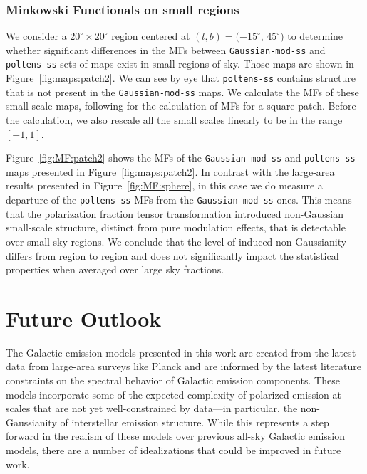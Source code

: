 \documentclass[twocolumn]{aastex631}
\begin{document}
\subsubsection{Minkowski Functionals on small regions}
We consider a $20^{\circ}\times20^{\circ}$ region centered at $(l, b) = (-15^{\circ}$, $45^{\circ})$ to determine whether significant differences in the MFs between \texttt{Gaussian-mod-ss} and \texttt{poltens-ss} sets of maps exist in small regions of sky. Those maps are shown in Figure~\ref{fig:maps:patch2}. We can see by eye that \texttt{poltens-ss} contains structure that is not present in the \texttt{Gaussian-mod-ss} maps. We calculate the MFs of these small-scale maps, following \cite{Mantz:2008} for the calculation of MFs for a square patch. Before the calculation, we also rescale all the small scales linearly to be in the range $[-1, 1]$.

Figure~\ref{fig:MF:patch2} shows the MFs of the \texttt{Gaussian-mod-ss} and \texttt{poltens-ss} maps presented in Figure~\ref{fig:maps:patch2}. In contrast with the large-area results presented in Figure~\ref{fig:MF:sphere}, in this case we do measure a departure of the \texttt{poltens-ss} MFs from the \texttt{Gaussian-mod-ss} ones. This means that the polarization fraction tensor transformation introduced non-Gaussian small-scale structure, distinct from pure modulation effects, that is detectable over small sky regions. We conclude that the level of induced non-Gaussianity differs from region to region and does not significantly impact the statistical properties when averaged over large sky fractions.

\section{Future Outlook} \label{sec:discussion}

The Galactic emission models presented in this work are created from the latest data from large-area surveys like Planck and are informed by the latest literature constraints on the spectral behavior of Galactic emission components. These models incorporate some of the expected complexity of polarized emission at scales that are not yet well-constrained by data---in particular, the non-Gaussianity of interstellar emission structure. While this represents a step forward in the realism of these models over previous all-sky Galactic emission models, there are a number of idealizations that could be improved in future work.

\end{document}
